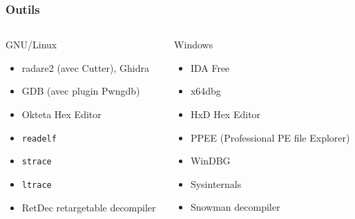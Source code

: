 \documentclass[10pt,xcolor={table,dvipsnames},t]{beamer}
\begin{document}
\begin{frame}
    \frametitle{Outils}
    
    \begin{columns}[T]
    
        \begin{column}{0.48\textwidth}
        GNU/Linux
        \begin{itemize}
            \item radare2 (avec Cutter), Ghidra
            \item GDB (avec plugin Pwngdb)
            \item Okteta Hex Editor
            \item \texttt{readelf}
            \item \texttt{strace}
            \item \texttt{ltrace}
            \item RetDec retargetable decompiler 
        \end{itemize}
        \end{column}
        
        \begin{column}{0.48\textwidth}
        Windows
        \begin{itemize}
            \item IDA Free
            \item x64dbg
            \item HxD Hex Editor
            \item PPEE (Professional PE file Explorer)
            \item WinDBG
            \item Sysinternals
            \item Snowman decompiler
        \end{itemize}
        \end{column}
    
    \end{columns}
\end{frame}
\end{document}
